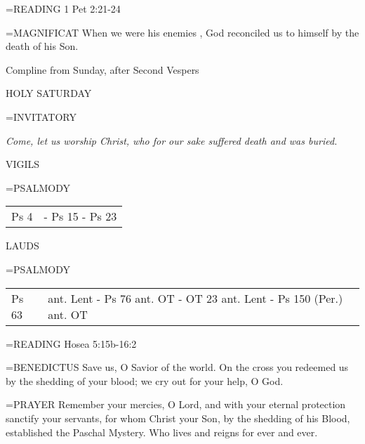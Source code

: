 \hangindent=\parindent \small{\uppercase{READING}}    1 Pet 2:21-24 \textbf{   \\}

\hangindent=\parindent \small{MAGNIFICAT 	When we were his enemies , God reconciled us to himself by the death of his Son.\\}

Compline from Sunday, after Second Vespers

HOLY SATURDAY

\hangindent=\parindent \small{INVITATORY}
\begin{center}
\textit{Come, let us worship Christ, who for our sake suffered death and was buried.\\}
\end{center}

\begin{flushleft}\normalsize VIGILS\\\end{flushleft}
\hangindent=\parindent \small{PSALMODY}
\begin{center}
\begin{tabular}{ l l }
Ps 4 &  - Ps 15 - Ps 23\\
\end{tabular}
\end{center}		

\begin{flushleft}\normalsize LAUDS\\\end{flushleft}
\hangindent=\parindent \small{PSALMODY}
\begin{center}
\begin{tabular}{ l l }
Ps 63 &  ant. Lent - Ps 76 ant. OT - OT 23 ant. Lent - Ps 150 (Per.) ant. OT\\
\end{tabular}
\end{center}		

\hangindent=\parindent \small{\uppercase{READING}}    Hosea 5:15b-16:2 \textbf{   \\}

\hangindent=\parindent \small{BENEDICTUS 	Save us, O Savior of the world. On the cross you redeemed us by the shedding of your blood; we cry out for your help, O God.\\}

\hangindent=\parindent \small{PRAYER 	Remember your mercies, O Lord, and with your eternal protection sanctify your servants, for whom Christ your Son, by the shedding of his Blood, established the Paschal Mystery. Who lives and reigns for ever and ever.}

